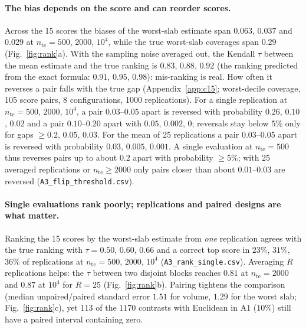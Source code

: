\paragraph{The bias depends on the score and can reorder scores.}
Across the 15 scores the biases of the worst-slab estimate span $0.063$, $0.037$ and $0.029$ at $n_{\mathrm{te}}=500$, $2000$, $10^4$, while the true worst-slab coverages span $0.29$ (Fig.~\ref{fig:rank}a).
With the sampling noise averaged out, the Kendall $\tau$ between the mean estimate and the true ranking is $0.83$, $0.88$, $0.92$ (the ranking predicted from the exact formula: $0.91$, $0.95$, $0.98$): mis-ranking is real. How often it reverses a pair falls with the true gap (Appendix~\ref{app:c15}; worst-decile coverage, 105 score pairs, 8 configurations, 1000 replications). For a single replication at $n_{\mathrm{te}}=500$, $2000$, $10^4$, a pair $0.03$--$0.05$ apart is reversed with probability $0.26$, $0.10$, $0.02$ and a pair $0.10$--$0.20$ apart with $0.05$, $0.002$, $0$; reversals stay below $5\%$ only for gaps $\ge0.2$, $0.05$, $0.03$. For the mean of 25 replications a pair $0.03$--$0.05$ apart is reversed with probability $0.03$, $0.005$, $0.001$. A single evaluation at $n_{\mathrm{te}}=500$ thus reverses pairs up to about $0.2$ apart with probability $\ge5\%$; with 25 averaged replications or $n_{\mathrm{te}}\ge2000$ only pairs closer than about $0.01$--$0.03$ are reversed (\texttt{A3\_flip\_threshold.csv}).

\paragraph{Single evaluations rank poorly; replications and paired designs are what matter.}
Ranking the 15 scores by the worst-slab estimate from \emph{one} replication agrees with the true ranking with $\tau=0.50$, $0.60$, $0.66$ and a correct top score in $23\%$, $31\%$, $36\%$ of replications at $n_{\mathrm{te}}=500$, $2000$, $10^4$ (\texttt{A3\_rank\_single.csv}).
Averaging $R$ replications helps: the $\tau$ between two disjoint blocks reaches $0.81$ at $n_{\mathrm{te}}=2000$ and $0.87$ at $10^4$ for $R=25$ (Fig.~\ref{fig:rank}b).
Pairing tightens the comparison (median unpaired/paired standard error $1.51$ for volume, $1.29$ for the worst slab; Fig.~\ref{fig:rank}c), yet 113 of the 1170 contrasts with Euclidean in A1 ($10\%$) still have a paired interval containing zero.

